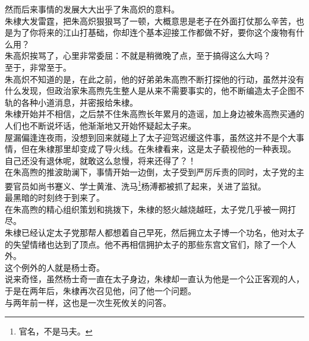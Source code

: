 \begin{multicols}{\theparacolNo}
然而后来事情的发展大大出乎了朱高炽的意料。\\

朱棣大发雷霆，把朱高炽狠狠骂了一顿，大概意思是老子在外面打仗那么辛苦，也是为了你将来的江山打基础，你却连个基本迎接工作都做不好，要你这个废物有什么用？\\

朱高炽挨骂了，心里非常委屈：不就是稍微晚了点，至于搞得这么大吗？\\

至于，非常至于。\\

朱高炽不知道的是，在此之前，他的好弟弟朱高煦不断打探他的行动，虽然并没有什么发现，但政治家朱高煦先生整人是从来不需要事实的，他不断编造太子企图不轨的各种小道消息，并密报给朱棣。\\

朱棣开始并不相信，之后禁不住朱高煦长年累月的造谣，加上身边被朱高煦买通的人们也不断说坏话，他渐渐地又开始怀疑起太子来。\\

屋漏偏逢连夜雨，没想到回来就碰上了太子迎驾迟缓这件事，虽然这并不是个大事情，但在朱棣那里却变成了导火线。在朱棣看来，这是太子藐视他的一种表现。\\

自己还没有退休呢，就敢这么怠慢，将来还得了？！\\

在朱高煦的推波助澜下，事情开始一边倒，太子受到严厉斥责的同时，太子党的主要官员如尚书蹇义、学士黄淮、洗马\footnote{官名，不是马夫。}杨溥都被抓了起来，关进了监狱。\\

最黑暗的时刻终于到来了。\\

在朱高煦的精心组织策划和挑拨下，朱棣的怒火越烧越旺，太子党几乎被一网打尽。\\

朱棣已经认定太子党那帮人都想着自己早死，然后拥立太子博一个功名，他对太子的失望情绪也达到了顶点。他不再相信拥护太子的那些东宫文官们，除了一个人外。\\

这个例外的人就是杨士奇。\\

说来奇怪，虽然杨士奇一直在太子身边，朱棣却一直认为他是一个公正客观的人，于是在两年后，朱棣再次召见他，问了他一个问题。\\

与两年前一样，这也是一次生死攸关的问答。\\


\end{multicols}
